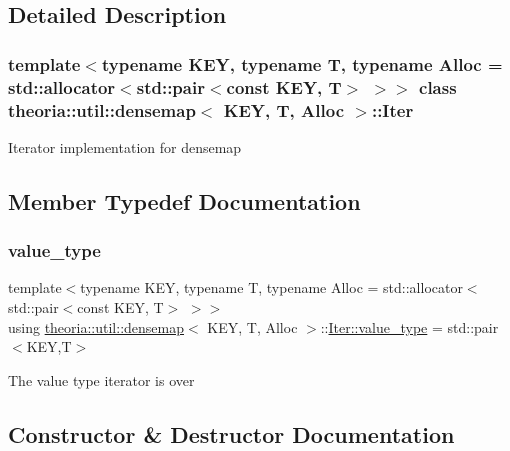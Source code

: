 \subsection{Detailed Description}
\subsubsection*{template$<$typename K\+EY, typename T, typename Alloc = std\+::allocator$<$std\+::pair$<$const K\+E\+Y, T$>$ $>$$>$\newline
class theoria\+::util\+::densemap$<$ K\+E\+Y, T, Alloc $>$\+::\+Iter}

Iterator implementation for densemap 

\subsection{Member Typedef Documentation}
\mbox{\label{classtheoria_1_1util_1_1densemap_1_1Iter_a8a1cedbd37c4faee8284d6f1debd49f2}} 
\subsubsection{\texorpdfstring{value\+\_\+type}{value\_type}}
{\footnotesize\ttfamily template$<$typename K\+EY, typename T, typename Alloc = std\+::allocator$<$std\+::pair$<$const K\+E\+Y, T$>$ $>$$>$ \\
using \hyperlink{classtheoria_1_1util_1_1densemap}{theoria\+::util\+::densemap}$<$ K\+EY, T, Alloc $>$\+::\hyperlink{classtheoria_1_1util_1_1densemap_1_1Iter_a8a1cedbd37c4faee8284d6f1debd49f2}{Iter\+::value\+\_\+type} =  std\+::pair$<$K\+EY,T$>$}

The value type iterator is over 

\subsection{Constructor \& Destructor Documentation}
\mbox{\label{classtheoria_1_1util_1_1densemap_1_1Iter_addc26bfe85f24fe8bcdde3846275901f}} 
